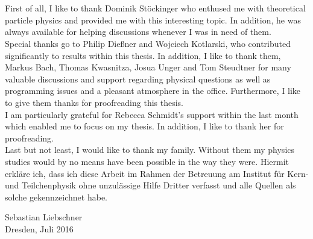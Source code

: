 \thispagestyle{empty}
\cleardoublepage
 
\tableofcontents
\newpage


\newpage

\newpage

\newpage

\newpage

\newpage

\newpage

\newpage

\newpage

\newpage
\cleardoublepage


\newpage

\newpage
\section*{}
First of all, I like to thank Dominik Stöckinger who enthused me with theoretical particle physics and provided me with this interesting topic. In addition, he was always available for helping discussions whenever I was in need of them.\\
Special thanks go to Philip Dießner and Wojciech Kotlarski, who contributed significantly to results within this thesis. In addition, I like to thank them, Markus Bach, Thomas Kwasnitza, Josua Unger and Tom Steudtner for many valuable discussions and support regarding physical questions as well as programming issues and a pleasant atmosphere in the office. Furthermore, I like to give them thanks for proofreading this thesis.\\
I am particularly grateful for Rebecca Schmidt's support within the last month which enabled me to focus on my thesis. In addition, I like to thank her for proofreading.\\
Last but not least, I would like to thank my family. Without them my physics studies would by no means have been possible in the way they were.
\newpage
\clearpage
\thispagestyle{empty}
\vspace*{1.5em}
Hiermit erkläre ich, dass ich diese Arbeit im Rahmen der Betreuung am Institut
für Kern- und Teilchenphysik ohne unzulässige Hilfe Dritter verfasst und alle Quellen als solche gekennzeichnet habe.
\vspace*{45em}
\par
Sebastian Liebschner\\
Dresden, Juli 2016


